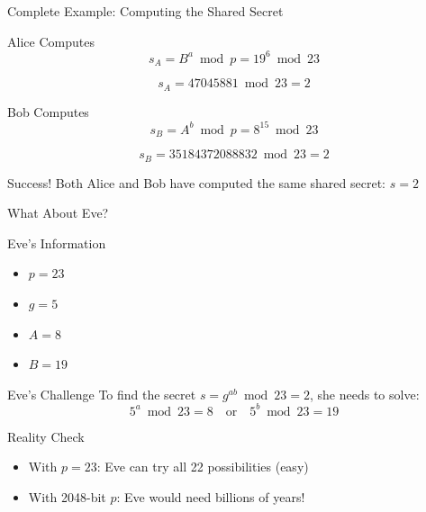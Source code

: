 \documentclass{beamer}
\begin{document}
\begin{frame}{Complete Example: Computing the Shared Secret}
\begin{block}{Alice Computes}
\[
s_A = B^a \bmod p = 19^6 \bmod 23
\]

\pause

\[
s_A = 47045881 \bmod 23 = 2
\]
\end{block}

\pause

\begin{block}{Bob Computes}
\[
s_B = A^b \bmod p = 8^{15} \bmod 23
\]

\pause

\[
s_B = 35184372088832 \bmod 23 = 2
\]
\end{block}

\pause

\begin{exampleblock}{Success!}
Both Alice and Bob have computed the same shared secret: $s = 2$
\end{exampleblock}
\end{frame}

\begin{frame}{What About Eve?}
\begin{block}{Eve's Information}
\begin{itemize}
    \item $p = 23$
    \item $g = 5$
    \item $A = 8$
    \item $B = 19$
\end{itemize}
\end{block}

\pause

\begin{alertblock}{Eve's Challenge}
To find the secret $s = g^{ab} \bmod 23 = 2$, she needs to solve:
\[
5^a \bmod 23 = 8 \quad \text{or} \quad 5^b \bmod 23 = 19
\]
\end{alertblock}

\pause

\begin{block}{Reality Check}
\begin{itemize}
    \item With $p = 23$: Eve can try all 22 possibilities (easy)
    \item With 2048-bit $p$: Eve would need billions of years!
\end{itemize}
\end{block}
\end{frame}
\end{document}
